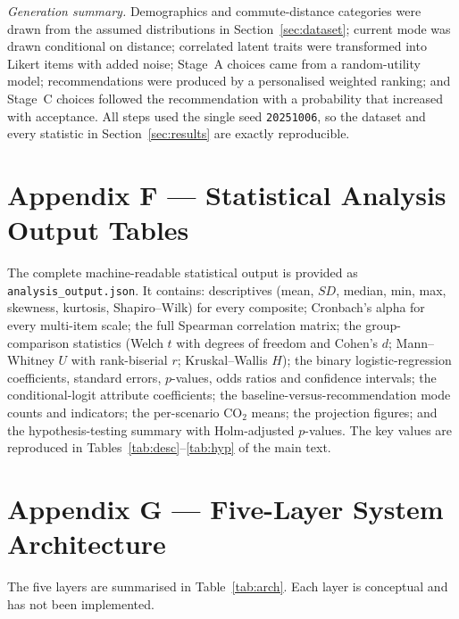 \documentclass[11pt,a4paper]{article}
\newcommand{\code}[1]{\texttt{#1}}
\begin{document}
\noindent\textit{Generation summary.} Demographics and commute-distance categories were drawn from the
assumed distributions in Section~\ref{sec:dataset}; current mode was drawn conditional on distance;
correlated latent traits were transformed into Likert items with added noise; Stage~A choices came from
a random-utility model; recommendations were produced by a personalised weighted ranking; and Stage~C
choices followed the recommendation with a probability that increased with acceptance. All steps used
the single seed \code{20251006}, so the dataset and every statistic in Section~\ref{sec:results} are
exactly reproducible.

\section{Appendix F --- Statistical Analysis Output Tables}
\label{app:stats}

The complete machine-readable statistical output is provided as \code{analysis\_output.json}. It
contains: descriptives (mean, $SD$, median, min, max, skewness, kurtosis, Shapiro--Wilk) for every
composite; Cronbach's alpha for every multi-item scale; the full Spearman correlation matrix; the
group-comparison statistics (Welch $t$ with degrees of freedom and Cohen's $d$; Mann--Whitney $U$ with
rank-biserial $r$; Kruskal--Wallis $H$); the binary logistic-regression coefficients, standard errors,
$p$-values, odds ratios and confidence intervals; the conditional-logit attribute coefficients; the
baseline-versus-recommendation mode counts and indicators; the per-scenario CO$_2$ means; the
projection figures; and the hypothesis-testing summary with Holm-adjusted $p$-values. The key values
are reproduced in Tables~\ref{tab:desc}--\ref{tab:hyp} of the main text.

\section{Appendix G --- Five-Layer System Architecture}
\label{app:arch}

The five layers are summarised in Table~\ref{tab:arch}. Each layer is conceptual and has not been
implemented.
\end{document}
